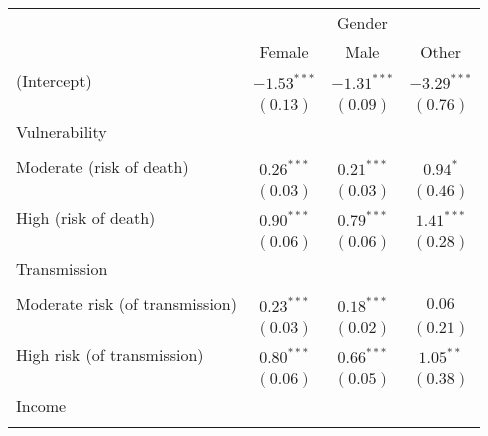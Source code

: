 
\begin{table}
\begin{center}
\begin{scriptsize}
\begin{tabular}{l c c c}
\hline
 & \multicolumn{3}{c}{Gender} \\
\cline{2-4}
 & Female & Male & Other \\
\hline
(Intercept)                                     & $-1.53^{***}$ & $-1.31^{***}$ & $-3.29^{***}$ \\
                                                & $(0.13)$      & $(0.09)$      & $(0.76)$      \\
Vulnerability                                   &               &               &               \\
                                                &               &               &               \\
\quad Moderate (risk of death)                  & $0.26^{***}$  & $0.21^{***}$  & $0.94^{*}$    \\
                                                & $(0.03)$      & $(0.03)$      & $(0.46)$      \\
\quad High (risk of death)                      & $0.90^{***}$  & $0.79^{***}$  & $1.41^{***}$  \\
                                                & $(0.06)$      & $(0.06)$      & $(0.28)$      \\
Transmission                                    &               &               &               \\
                                                &               &               &               \\
\quad Moderate risk (of transmission)           & $0.23^{***}$  & $0.18^{***}$  & $0.06$        \\
                                                & $(0.03)$      & $(0.02)$      & $(0.21)$      \\
\quad High risk (of transmission)               & $0.80^{***}$  & $0.66^{***}$  & $1.05^{**}$   \\
                                                & $(0.06)$      & $(0.05)$      & $(0.38)$      \\
Income                                          &               &               &               \\
                                                &               &               &               \\

\end{tabular}
\end{scriptsize}
\end{center}
\end{table}
